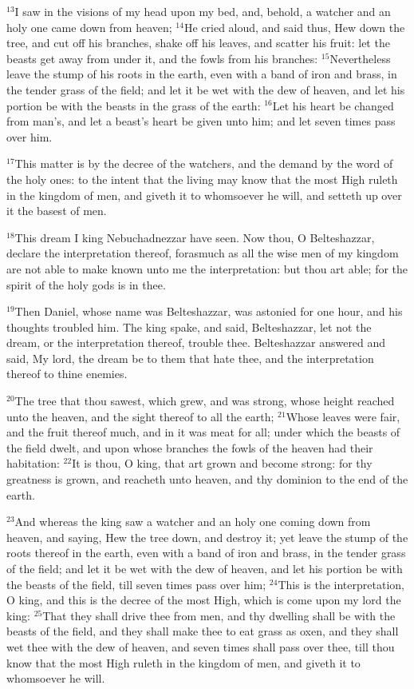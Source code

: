 \documentclass[12pt]{article}
\begin{document}
$^{13}$I saw in the visions of my head upon my bed, and, behold, a
watcher and an holy one came down from heaven; $^{14}$He cried aloud,
and said thus, Hew down the tree, and cut off his branches, shake off
his leaves, and scatter his fruit: let the beasts get away from under
it, and the fowls from his branches: $^{15}$Nevertheless leave the stump
of his roots in the earth, even with a band of iron and brass, in the
tender grass of the field; and let it be wet with the dew of heaven,
and let his portion be with the beasts in the grass of the earth: $^{16}$Let his heart be changed from man's, and let a beast's heart be given
unto him; and let seven times pass over him.


$^{17}$This matter is by the decree of the watchers, and the demand by
the word of the holy ones: to the intent that the living may know that
the most High ruleth in the kingdom of men, and giveth it to
whomsoever he will, and setteth up over it the basest of men.


$^{18}$This dream I king Nebuchadnezzar have seen. Now thou, O
Belteshazzar, declare the interpretation thereof, forasmuch as all the
wise men of my kingdom are not able to make known unto me the
interpretation: but thou art able; for the spirit of the holy gods is
in thee.


$^{19}$Then Daniel, whose name was Belteshazzar, was astonied for one
hour, and his thoughts troubled him. The king spake, and said,
Belteshazzar, let not the dream, or the interpretation thereof,
trouble thee. Belteshazzar answered and said, My lord, the dream be to
them that hate thee, and the interpretation thereof to thine enemies.


$^{20}$The tree that thou sawest, which grew, and was strong, whose
height reached unto the heaven, and the sight thereof to all the
earth; $^{21}$Whose leaves were fair, and the fruit thereof much, and in
it was meat for all; under which the beasts of the field dwelt, and
upon whose branches the fowls of the heaven had their habitation: $^{22}$It is thou, O king, that art grown and become strong: for thy
greatness is grown, and reacheth unto heaven, and thy dominion to the
end of the earth.


$^{23}$And whereas the king saw a watcher and an holy one coming down
from heaven, and saying, Hew the tree down, and destroy it; yet leave
the stump of the roots thereof in the earth, even with a band of iron
and brass, in the tender grass of the field; and let it be wet with
the dew of heaven, and let his portion be with the beasts of the
field, till seven times pass over him; $^{24}$This is the
interpretation, O king, and this is the decree of the most High, which
is come upon my lord the king: $^{25}$That they shall drive thee from
men, and thy dwelling shall be with the beasts of the field, and they
shall make thee to eat grass as oxen, and they shall wet thee with the
dew of heaven, and seven times shall pass over thee, till thou know
that the most High ruleth in the kingdom of men, and giveth it to
whomsoever he will.
\end{document}
